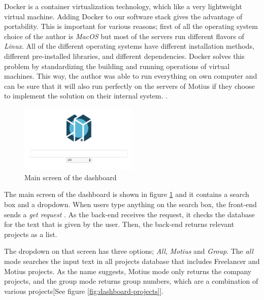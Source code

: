 Docker is a container virtualization technology, which like a very lightweight virtual machine. Adding Docker to our software stack gives the advantage of portability. This is important for various reasons; first of all the operating system choice of the author is \textit{MacOS} but most of the servers run different flavors of \textit{Linux}. All of the different operating systems have different installation methods, different pre-installed libraries, and different dependencies. Docker solves this problem by standardizing the building and running operations of virtual machines. This way, the author was able to run everything on own computer and can be sure that it will also run perfectly on the servers of Motius if they choose to implement the solution on their internal system. \cite{anderson2015docker}.


 \begin{figure}[htp]
	\centering
	\includegraphics[width=0.5\textwidth]{figures/DashboardMain.png}
	\caption{Main screen of the dashboard}
	\label{fig:dashboard-main}
\end{figure}


The main screen of the dashboard is shown in figure \ref{fig:dashboard-main} and it contains a search box and a dropdown. When users type anything on the search box, the front-end sends a \textit{get request} \cite{masse2011rest}. As the back-end receives the request, it checks the database for the text that is given by the user. Then, the back-end returns relevant projects as a list. 


The dropdown on that screen has three options; \textit{All},  \textit{Motius} and  \textit{Group}. The \textit{all} mode searches the input text in all projects database that includes Freelancer and Motius projects. As the name suggests, Motius mode only returns the company projects, and the group mode returns group numbers, which are a combination of various projects[See figure \ref{fig:dashboard-projects}]. 


